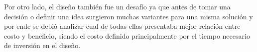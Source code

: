 Por otro lado, el diseño también fue un desafío ya que antes de tomar
una decisión o definir una idea surgieron muchas variantes para una
misma solución y por ende se debió analizar cual de todas ellas presentaba
mejor relación entre costo y beneficio, siendo el costo definido principalmente
por el tiempo necesario de inversión en el diseño. 